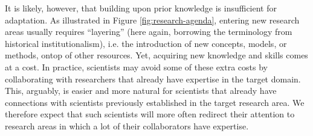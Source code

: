\documentclass{article}
\begin{document}
It is likely, however, that building upon prior knowledge is insufficient for adaptation. As illustrated in Figure \ref{fig:research-agenda}, entering new research areas usually  requires ``layering'' (here again, borrowing the terminology from historical institutionalism), i.e. the introduction of new concepts, models, or methods, ontop of other resources. Yet, acquiring new knowledge and skills comes at a cost. In practice, scientists may avoid some of these extra costs by collaborating with researchers that already have expertise in the target domain. This, arguably, is easier and more natural for scientists that already have connections with scientists previously established in the target research area. We therefore expect that such scientists will more often redirect their attention to research areas in which a lot of their collaborators have expertise.
\end{document}
